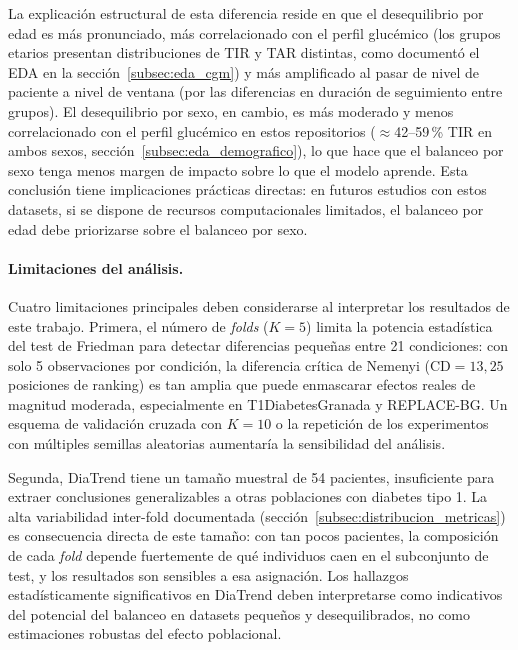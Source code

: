La explicación estructural de esta diferencia reside en que el
desequilibrio por edad es más pronunciado, más correlacionado con el
perfil glucémico (los grupos etarios presentan distribuciones de TIR y
TAR distintas, como documentó el EDA en la sección~\ref{subsec:eda_cgm})
y más amplificado al pasar de nivel de paciente a nivel de ventana
(por las diferencias en duración de seguimiento entre grupos). El
desequilibrio por sexo, en cambio, es más moderado y menos correlacionado
con el perfil glucémico en estos repositorios ($\approx$42--59\,\% TIR
en ambos sexos, sección~\ref{subsec:eda_demografico}), lo que hace que
el balanceo por sexo tenga menos margen de impacto sobre lo que el
modelo aprende. Esta conclusión tiene implicaciones prácticas directas:
en futuros estudios con estos datasets, si se dispone de recursos
computacionales limitados, el balanceo por edad debe priorizarse sobre
el balanceo por sexo.

\paragraph{Limitaciones del análisis.}

Cuatro limitaciones principales deben considerarse al interpretar los
resultados de este trabajo. Primera, el número de \textit{folds} ($K=5$)
limita la potencia estadística del test de Friedman para detectar
diferencias pequeñas entre 21 condiciones: con solo 5 observaciones por
condición, la diferencia crítica de Nemenyi ($\text{CD} = 13{,}25$
posiciones de ranking) es tan amplia que puede enmascarar efectos reales
de magnitud moderada, especialmente en T1DiabetesGranada y REPLACE-BG.
Un esquema de validación cruzada con $K=10$ o la repetición de los
experimentos con múltiples semillas aleatorias aumentaría la sensibilidad
del análisis.

Segunda, DiaTrend tiene un tamaño muestral de 54 pacientes, insuficiente
para extraer conclusiones generalizables a otras poblaciones con diabetes
tipo 1. La alta variabilidad inter-fold documentada (sección~\ref{subsec:distribucion_metricas})
es consecuencia directa de este tamaño: con tan pocos pacientes, la
composición de cada \textit{fold} depende fuertemente de qué individuos
caen en el subconjunto de test, y los resultados son sensibles a esa
asignación. Los hallazgos estadísticamente significativos en DiaTrend
deben interpretarse como indicativos del potencial del balanceo en
datasets pequeños y desequilibrados, no como estimaciones robustas del
efecto poblacional.


